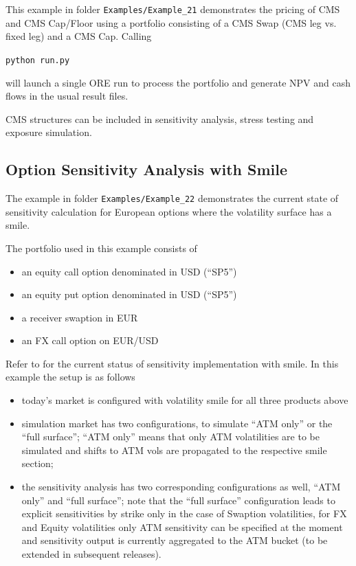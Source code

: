This example in folder {\tt Examples/Example\_21} demonstrates the pricing of CMS and CMS Cap/Floor using a portfolio consisting of a CMS Swap (CMS leg vs. fixed leg) and a CMS Cap. Calling

\medskip
\centerline{\tt python run.py}

\medskip
will launch a single ORE run to process the portfolio and generate NPV and cash flows in the usual result files.

\medskip
CMS structures can be included in sensitivity analysis, stress testing and exposure simulation.

\subsection{Option Sensitivity Analysis with Smile}%

The example in folder {\tt Examples/Example\_22} demonstrates the current state of sensitivity calculation for European options where the volatility surface has a smile.

\medskip
The portfolio used in this example consists of
\begin{itemize}
	\item an equity call option denominated in USD (``SP5'')
	\item an equity put option denominated in USD (``SP5'')
	\item a receiver swaption in EUR
	\item an FX call option on EUR/USD
\end{itemize}

\medskip
Refer to \cite{methods} for the current status of sensitivity implementation with smile. In this example the setup is as follows
\begin{itemize}
\item today's market is configured with volatility smile for all three products above
\item simulation market has two configurations, to simulate ``ATM only'' or the ``full surface''; ``ATM only'' means that only ATM volatilities are to be simulated and shifts to ATM vols are propagated to the respective smile section;
\item the sensitivity analysis has two corresponding configurations as well, ``ATM only'' and ``full surface''; note that the ``full surface'' configuration leads to explicit sensitivities by strike only in the case of Swaption volatilities, for FX and Equity volatilities only ATM sensitivity can be specified at the moment and sensitivity output is currently aggregated to the ATM bucket (to be extended in subsequent releases).
\end{itemize}


